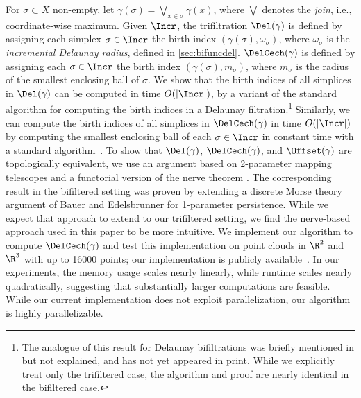 %
For $\sigma\subset X$ non-empty, let $\gamma(\sigma)=\bigvee_{x\in \sigma} \gamma(x)$, where $\bigvee$ denotes the \emph{join}, i.e., coordinate-wise maximum. 
Given $\Incr$, the trifiltration $\Del(\gamma)$ is defined by assigning each simplex $\sigma \in \Incr$ the birth index $(\gamma(\sigma), \omega_{\sigma})$, where $\omega_\sigma$ is the \emph{incremental Delaunay radius}, defined in \cref{sec:bifuncdel}.
$\DelCech(\gamma)$ is defined by assigning each $\sigma \in \Incr$ the birth index $(\gamma(\sigma), m_\sigma)$, where $m_\sigma$ is the radius of the smallest enclosing ball of $\sigma$.  We show that the birth indices of all simplices in $\Del(\gamma)$ can be computed in time $O(|\Incr|)$, by a variant of the standard algorithm for computing the birth indices in a Delaunay filtration.\footnote{The analogue of this result for Delaunay bifiltrations was briefly mentioned in \cite{alonsoDelaunayBifiltrationsFunctions2024} but not explained, and has not yet appeared in print.  While we explicitly treat only the trifiltered case, the algorithm and proof are nearly identical in the bifiltered case.}  Similarly, we can compute the birth indices of all simplices in $\DelCech(\gamma)$ in time $O(|\Incr|)$ by computing the smallest enclosing ball of each $\sigma\in\Incr$ in constant time with a standard algorithm~\cite{fischerFastSmallestEnclosingBallComputation2003,fischerSmallestEnclosingBall2004,cgal:fghhs-bv-24a}.  
%
To show that $\Del(\gamma)$, $\DelCech(\gamma)$, and $\Offset(\gamma)$ are topologically equivalent, we use an argument based on 2-parameter mapping telescopes and a functorial version of the nerve theorem \cite{bauerUnifiedViewFunctorial2023}.  The corresponding result in the bifiltered setting \cite[Corollary 3.4]{alonsoDelaunayBifiltrationsFunctions2024} was proven by extending a discrete Morse theory argument of Bauer and Edelsbrunner \cite{bauer2017morse} for 1-parameter persistence.  While we expect that approach to extend to our trifiltered setting, we find the nerve-based approach used in this paper to be more intuitive. %
%
We implement our algorithm to compute $\DelCech(\gamma)$ and test this implementation on point clouds in $\R^2$ and $\R^{3}$ with up to 16000 points; our implementation is publicly available~\cite{function_delaunay}.    In our experiments, the memory usage scales nearly linearly, while runtime scales nearly quadratically, suggesting that substantially larger computations are feasible.  While our current implementation does not exploit parallelization, our algorithm is highly parallelizable.
